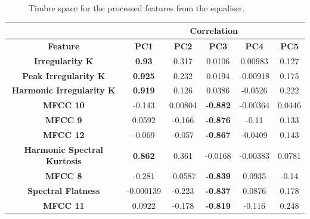 		\begin{figure}[h!]
			\centering
			\qquad
			\caption{Timbre space for the processed features from the equaliser.}
			\label{fig:EqualiserProcessedPCAs}
		\end{figure}

		\begin{table}
			\centering
			\begin{tabular}{|c|c|c|c|c|c|}
				\cline{2-6}
				\multicolumn{1}{c}{} & \multicolumn{5}{|c|}{\bf{Correlation}} \tabularnewline
				\hline
				\bf{Feature} & \bf{PC1} & \bf{PC2} & \bf{PC3} & \bf{PC4} & \bf{PC5} \tabularnewline
				\hline
				\hline
				\bf{Irregularity K} & \bf{0.93} & 0.317 & 0.0106 & 0.00983 & 0.127 \tabularnewline
				\hline
				\bf{Peak Irregularity K} & \bf{0.925} & 0.232 & 0.0194 & -0.00918 & 0.175 \tabularnewline
				\hline
				\bf{Harmonic Irregularity K} & \bf{0.919} & 0.126 & 0.0386 & -0.0526 & 0.222 \tabularnewline
				\hline
				\bf{MFCC 10} & -0.143 & 0.00804 & \bf{-0.882} & -0.00364 & 0.0446 \tabularnewline
				\hline
				\bf{MFCC 9} & 0.0592 & -0.166 & \bf{-0.876} & -0.11 & 0.133 \tabularnewline
				\hline
				\bf{MFCC 12} & -0.069 & -0.057 & \bf{-0.867} & -0.0409 & 0.143 \tabularnewline
				\hline
				\bf{Harmonic Spectral Kurtosis} & \bf{0.862} & 0.361 & -0.0168 & -0.00383 & 0.0781 \tabularnewline
				\hline
				\bf{MFCC 8} & -0.281 & -0.0587 & \bf{-0.839} & 0.0935 & -0.14 \tabularnewline
				\hline
				\bf{Spectral Flatness} & -0.000139 & -0.223 & \bf{-0.837} & 0.0876 & 0.178 \tabularnewline
				\hline
				\bf{MFCC 11} & 0.0922 & -0.178 & \bf{-0.819} & -0.116 & 0.248 \tabularnewline
				\hline
			\end{tabular}
		\end{table}

